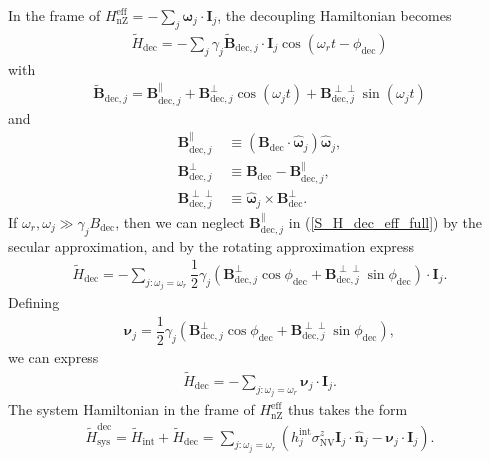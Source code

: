 \documentclass[twocolumn]{revtex4-1}
\renewcommand{\t}{\text} %
\newcommand{\f}[2]{\dfrac{#1}{#2}} %
\newcommand{\p}[1]{\left(#1\right)} %
\renewcommand{\v}{\bm} %
\newcommand{\uv}[1]{\hat{\v{#1}}} %
\renewcommand{\c}{\cdot} %
\newcommand{\NV}{\t{NV}}
\begin{document}
In the frame of $H_\t{nZ}^\t{eff}=-\sum_j\v\omega_j\c\v I_j$, the
decoupling Hamiltonian becomes
\begin{align}
  \tilde H_\t{dec} = -\sum_j\gamma_j\tilde{\v B}_{\t{dec},j}
  \c\v I_j \cos\p{\omega_rt-\phi_\t{dec}}
  \label{S_H_dec_eff_full}
\end{align}
with
\begin{align}
  \tilde{\v B}_{\t{dec},j} = \v B_{\t{dec},j}^\parallel
  + \v B_{\t{dec},j}^\perp\cos\p{\omega_j t}
  + \v B_{\t{dec},j}^{\perp\perp}\sin\p{\omega_j t}
\end{align}
and
\begin{align}
  \v B_{\t{dec},j}^\parallel
  &\equiv \p{\v B_\t{dec} \c\uv\omega_j}\uv\omega_j, \\
  \v B_{\t{dec},j}^\perp
  &\equiv \v B_\t{dec} - \v B_{\t{dec},j}^\parallel, \\
  \v B_{\t{dec},j}^{\perp\perp}
  &\equiv \uv\omega_j\times\v B_\t{dec}^\perp.
\end{align}
If $\omega_r,\omega_j\gg \gamma_jB_\t{dec}$, then we can neglect
$\v B_{\t{dec},j}^\parallel$ in (\ref{S_H_dec_eff_full}) by the
secular approximation, and by the rotating approximation express
\begin{align}
  \tilde H_\t{dec} = -\sum_{j:\omega_j=\omega_r}
  \f12\gamma_j\p{\v B_{\t{dec},j}^\perp\cos\phi_\t{dec} +
  \v B_{\t{dec},j}^{\perp\perp}\sin\phi_\t{dec}}\c\v I_j.
\end{align}
Defining
\begin{align}
  \v\nu_j = \f12\gamma_j\p{\v B_{\t{dec},j}^\perp\cos\phi_\t{dec}
  + \v B_{\t{dec},j}^{\perp\perp}\sin\phi_\t{dec}},
\end{align}
we can express
\begin{align}
  \tilde H_\t{dec} = -\sum_{j:\omega_j=\omega_r}\v\nu_j\c\v I_j.
\end{align}
The system Hamiltonian in the frame of $H_\t{nZ}^\t{eff}$ thus takes
the form
\begin{align}
  \tilde H_\t{sys}^\t{dec} = \tilde H_\t{int} + \tilde H_\t{dec}
  = \sum_{j:\omega_j=\omega_r}
  \p{h_j^\t{int}\sigma_\NV^z\v I_j\c\uv n_j - \v\nu_j\c\v I_j}.
\end{align}
\end{document}
